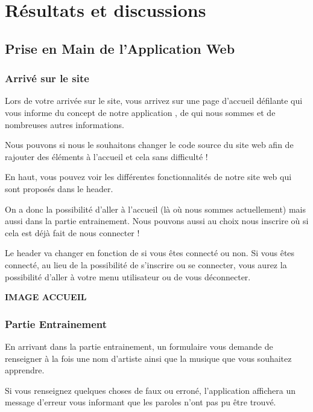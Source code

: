 \documentclass[12pt,french]{article}
\begin{document}
\section{Résultats et discussions}

\subsection{Prise en Main de l'Application Web}

\subsubsection{Arrivé sur le site}

Lors de votre arrivée sur le site, vous arrivez sur une page d'accueil défilante qui vous informe du concept de notre application , de qui nous sommes et de nombreuses autres informations.

Nous pouvons si nous le souhaitons changer le code source du site web afin de rajouter des éléments à l'accueil et cela sans difficulté !

\medskip

En haut, vous pouvez voir les différentes fonctionnalités de notre site web qui sont proposés dans le header.

On a donc la possibilité d'aller à l'accueil 
(là où nous sommes actuellement) mais aussi dans la partie entrainement. Nous pouvons aussi au choix nous inscrire où si cela est déjà fait de nous connecter !

Le header va changer en fonction de si vous êtes connecté ou non. Si vous êtes connecté, au lieu de la possibilité de s'inscrire ou se connecter, vous aurez la possibilité d'aller à votre menu utilisateur ou de vous déconnecter.

\textbf{IMAGE ACCUEIL}

\subsubsection{Partie Entrainement}

En arrivant dans la partie entrainement, un formulaire vous demande de renseigner à la fois une nom d'artiste ainsi que la musique que vous souhaitez apprendre.

\medskip

Si vous renseignez quelques choses de faux ou erroné, l'application affichera un message d'erreur vous informant que les paroles n'ont pas pu être trouvé.

\medskip
\end{document}
